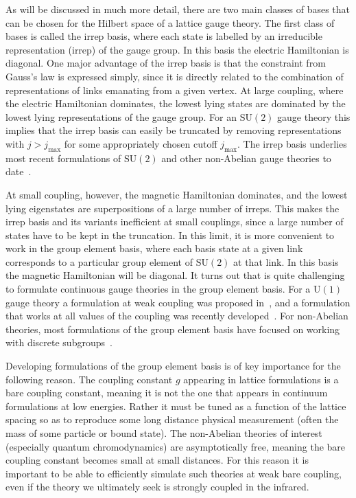 \documentclass[reprint,superscriptaddress,pra,nofootinbib,preprintnumbers,floatfix]{revtex4-1}
\providecommand{\uone}{$\mathrm{U}(1)$\xspace}
\providecommand{\sutwo}{$\mathrm{SU}(2)$\xspace}
\begin{document}
As will be discussed in much more detail, there are two main classes of bases that can be chosen for the Hilbert space of a lattice gauge theory. 
%
The first class of bases is called the irrep basis,  where each state is labelled by an irreducible representation (irrep) of the gauge group. 
%
In this basis the electric Hamiltonian is diagonal. 
%
One major advantage of the irrep basis is that the constraint from Gauss's law is expressed simply, since it is directly related to the combination of representations of links emanating from a given vertex.
%
At large coupling, where the electric Hamiltonian dominates, the lowest lying states are dominated by the lowest lying representations of the gauge group. For an \sutwo gauge theory this implies that the irrep basis can easily be truncated by removing representations with $j > j_\mathrm{max}$ for some appropriately chosen cutoff $j_\mathrm{max}$.
%
The irrep basis underlies most recent formulations of \sutwo and other non-Abelian gauge theories to date~\cite{Raychowdhury2023,Mathur:2004kr,mathur2006loop,mathur2007loop,Klco:2019evd,Davoudi:2020yln,Ciavarella:2021nmj,Byrnes:2005qx,Anishetty:2009nh,Banuls:2017ena,Raychowdhury:2018osk,Raychowdhury:2019iki}.



At small coupling, however, the magnetic Hamiltonian dominates, and the lowest lying eigenstates are superpositions of a large number of irreps. 
%
This makes the irrep basis and its variants inefficient at small couplings, since a large number of states have to be kept in the truncation.
%
In this limit, it is more convenient to work in the group element basis, where each basis state at a given link corresponds to a particular group element of \sutwo at that link. 
%
In this basis the magnetic Hamiltonian will be diagonal. 
%
It turns out that is quite challenging to formulate continuous gauge theories in the group element basis. For a \uone gauge theory a formulation at weak coupling was proposed in~\cite{Haase:2020kaj}, and a formulation that works at all values of the coupling was recently developed~\cite{Bauer:2021gek}.
%
For non-Abelian theories, most formulations of the group element basis have focused on working with discrete subgroups~\cite{Zohar:2014qma, Alexandru:2019nsa,Lamm:2019bik, Lamm2022,Lamm2020}.



Developing formulations of the group element basis is of key importance for the following reason.
%
The coupling constant $g$ appearing in lattice formulations is a bare coupling constant, meaning it is not the one that appears in continuum formulations at low energies. 
%
Rather it must be tuned as a function of the lattice spacing so as to reproduce some long distance physical measurement (often the mass of some particle or bound state). 
%
The non-Abelian theories of interest (especially quantum chromodynamics) are asymptotically free, meaning the bare coupling constant becomes small at small distances. 
%
For this reason it is important to be able to efficiently simulate such theories at weak bare coupling, even if the theory we ultimately seek is strongly coupled in the infrared.   
\end{document}
